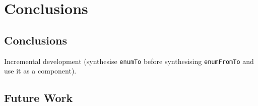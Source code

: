 \chapter{Conclusions} \label{ch:conclusions}

\section{Conclusions}
Incremental development (synthesise \lstinline?enumTo? before synthesising \lstinline?enumFromTo? and use it as a component).
  
\section{Future Work}


